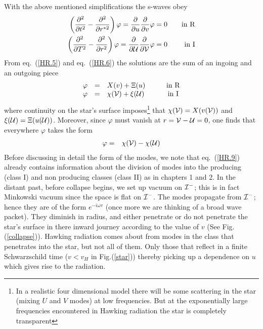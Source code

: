 \documentclass[12pt,oneside]{report}
\begin{document}
With the above mentioned simplifications the s-waves 
obey
 \begin {eqnarray}
\left( {\partial ^2 \over \partial t^2} - {\partial ^2 \over \partial r
^{*2}} \right) \varphi =
{\partial  \over \partial u}{\partial  \over \partial v}\varphi
=0 &\quad& {\rm in\ R}
\label {HR.5} \\
\left( {\partial ^2 \over \partial T^2} - {\partial ^2 \over \partial
r ^{2}} \right) \varphi = {\partial  \over \partial  {\cal{U}} }
{\partial  \over \partial  {\cal{V}} }\varphi
=0 &\quad& {\rm in\ I}
\label {HR.6} 
\end {eqnarray} 
\noindent From eq.~(\ref {HR.5})  and eq.~(\ref {HR.6}) the solutions are the sum of an
ingoing and an outgoing piece
\begin{equation}
\begin {array}{cclcc}
\varphi& =& X(v) + \Xi(u) &\quad& {\rm in\ R}
\label{HR.7}\\
\varphi &=& \chi( {\cal{V}} ) + \xi( {\cal{U}} ) &\quad& {\rm in\ I}
\end{array}
\end{equation}
where continuity on the star's surface 
imposes\footnote{In a realistic four dimensional model there will be some
scattering in the star (mixing $U$ and $V$ modes) at low frequencies.
But at the exponentially large frequencies encountered in Hawking radiation
the star is completely transparent} that $\chi( {\cal{V}} ) = X(v( {\cal{V}} ))$
and $\xi( {\cal{U}} ) = \Xi(u( {\cal{U}} ))$. 
Moreover, since $\varphi$
must vanish at ${r={\cal{V}}-{\cal{U}}=0}$,
one finds
that everywhere $\varphi$ takes the form
\begin {eqnarray}
\varphi &=& \chi( {\cal{V}} ) - \chi( {\cal{U}} ) 
\label{HR.9}
\end{eqnarray}
Before discussing in detail the form of the modes, 
we note that 
eq.~(\ref {HR.9}) 
already contains information about the division of modes into
the producing (class I) and non producing classes (class II)
as in chapters 1 and 2. In the distant
past, before collapse begins, we 
set up vacuum on  ${\cal I}^-$; this is in fact
Minkowski vacuum since the space is flat on  ${\cal I}^-$. The modes propagate
from  ${\cal I}^-$; hence they are 
of the form $e^{-i \omega v}$ (once more we are
thinking of a broad wave packet). They diminish 
in radius, and either penetrate or
do not penetrate the star's surface in there inward journey according to the
value of $v$ (See Fig.(\ref{collapse})). Hawking 
radiation comes about from modes in
the class that penetrates into the star, but not 
all of them. Only those that reflect
in a finite Schwarzschild time  ($v<v_H$ in Fig.(\ref{star})) 
thereby picking up a
dependence on $u$ which gives rise to the radiation. 
\end{document}

